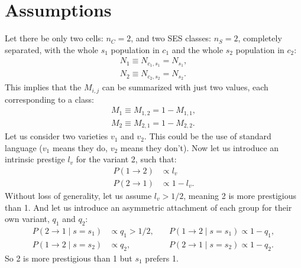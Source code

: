 \documentclass[../thesis.tex]{subfiles}
\begin{document}
\section{Assumptions}
Let there be only two cells: $n_C = 2$, and two \ac{SES} classes: $n_S = 2$, completely
separated, with the whole $s_1$ population in $c_1$ and the whole $s_2$ population in
$c_2$:
\begin{equation}
    \begin{aligned}
        N_1 \equiv N_{c_1, s_1} = N_{s_1}, \\
        N_2 \equiv N_{c_2, s_2} = N_{s_2}.
    \end{aligned}
\end{equation}
This implies that the $M_{i,j}$ can be summarized with just two values, each
corresponding to a class:
\begin{equation}
    \begin{aligned}
        M_1 \equiv M_{1, 2} = 1 - M_{1, 1}, \\
        M_2 \equiv M_{2, 1} = 1 - M_{2, 2}.
    \end{aligned}
\end{equation}
Let us consider two varieties $v_1$ and $v_2$. This could be the use of standard
language ($v_1$ means they do, $v_2$ means they don't). Now let us introduce an
intrinsic prestige $l_v$ for the variant 2, such that:
\begin{equation}
    \begin{aligned}
        P(1 \rightarrow 2) &\propto l_v \\
        P(2 \rightarrow 1) &\propto 1 - l_v.
    \end{aligned}
\end{equation}
Without loss of generality, let us assume $l_v > 1/2$, meaning 2 is more prestigious
than 1. And let us introduce an asymmetric attachment of each group for their own
variant, $q_1$ and $q_2$:
\begin{equation}
    \begin{aligned}
        P(2 \rightarrow 1 \mid s = s_1) &\propto q_1 > 1/2, \quad&  P(1 \rightarrow 2 \mid s = s_1) \propto 1 - q_1, \\
        P(1 \rightarrow 2 \mid s = s_2) &\propto q_2, \quad&  P(2 \rightarrow 1 \mid s = s_2) \propto 1 - q_2.
    \end{aligned}
\end{equation}
So 2 is more prestigious than 1 but $s_1$ prefers 1.
\end{document}
